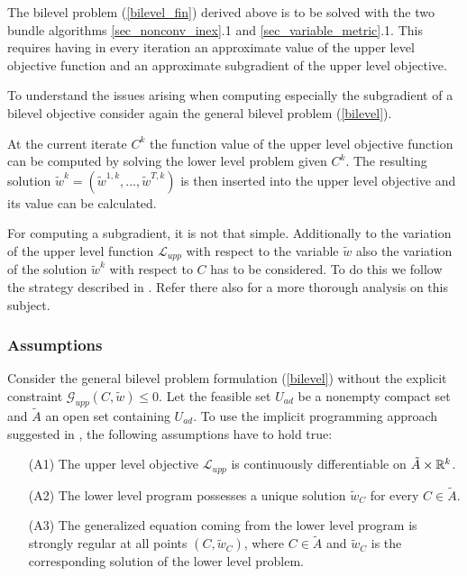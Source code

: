 The bilevel problem (\ref{bilevel_fin}) derived above is to be solved with the two bundle algorithms \ref{sec_nonconv_inex}.1 and \ref{sec_variable_metric}.1.
This requires having in every iteration an approximate value of the upper level objective function and an approximate subgradient of the upper level objective.

To understand the issues arising when computing especially the subgradient of a bilevel objective consider again the general bilevel problem (\ref{bilevel}).

At the current iterate \(C^k\) the function value of the upper level objective function can be computed by solving the lower level problem given \(C^k\).
The resulting solution \(\tilde{w}^k = (\tilde{w}^{1,k},...,\tilde{w}^{T,k})\) is then inserted into the upper level objective and its value can be calculated.

For computing a subgradient, it is not that simple. Additionally to the variation of the upper level function \(\mathcal{L}_{upp}\) with respect to the variable \(\tilde{w}\) also the variation of the solution \(\tilde{w}^k\) with respect to \(C\) has to be considered.
To do this we follow the strategy described in \cite{Outrata1998}. Refer there also for a more thorough analysis on this subject.

\subsubsection{Assumptions}
\label{sec_str_reg}

Consider the general bilevel problem formulation (\ref{bilevel}) without the explicit constraint \(\mathcal{G}_{upp}(C,\tilde{w}) \leq 0\).
Let the feasible set \(U_{ad}\) be a nonempty compact set and \(\tilde{A}\) an open set containing \(U_{ad}\).
To use the implicit programming approach suggested in \cite{Outrata1998},  the following assumptions have to hold true:

\begin{itemize}
\item[(A1)] The upper level objective \(\mathcal{L}_{upp}\) is continuously differentiable on \(\tilde{A}\times \mathbb{R}^k\).
\item[(A2)] The lower level program possesses a unique solution \(\tilde{w}_C\) for every \(C\in \tilde{A}\).
\item[(A3)] The generalized equation coming from the lower level program is strongly regular at all points \((C,\tilde{w}_C)\), where \(C \in \tilde{A}\) and \(\tilde{w}_C\) is the corresponding solution of the lower level problem.
\end{itemize}

